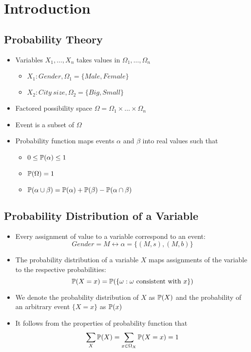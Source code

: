 \section{Introduction}

\subsection{Probability Theory}
	\begin{frame}
		\begin{itemize}
			\item Variables $X_1, \ldots , X_n$ takes values in $\Omega_1 , \ldots , \Omega_n$
				\begin{itemize}
					\item $X_1: {Gender} , \Omega_1 = \{ {Male} , {Female} \}$
					\item $X_2: {City\ size} , \Omega_2 = \{ {Big} , {Small} \}$
				\end{itemize}
			\item Factored possibility space $\Omega = \Omega_1 \times \ldots \times \Omega_n$
			\item Event is a subset of $\Omega$
			\item Probability function maps events $\alpha$ and $\beta$ into real values such that
			\begin{itemize}
				\item $0 \leq \P( \alpha ) \leq 1 $
				\item $\P( \Omega ) = 1$
				\item $\P( \alpha \cup \beta ) = \P( \alpha ) + \P( \beta ) - \P( \alpha \cap \beta )$
			\end{itemize}
		\end{itemize}
	\end{frame}

\subsection{Probability Distribution of a Variable}
	\begin{frame}
		\begin{itemize}
			\item Every assignment of value to a variable correspond to an event:
				\[ {Gender} = M \leftrightarrow \alpha = \{ ( M , s ) , ( M , b ) \} \]
			\item The probability distribution of a variable $X$ maps assignments of the variable to the respective probabilities:
				\[ \P( X = x ) = \P( \{ \omega : \omega \text{ consistent with } x \} ) \]
			\item We denote the probability distribution of $X$ as $\P( X )$ and the probability of an arbitrary event $\{ X = x \}$ as $\P( x )$
			\item It follows from the properties of probability function that
				\[ \sum_X \P( X ) = \sum_{x \in \Omega_X} \P( X = x ) = 1 \]
		\end{itemize}
	\end{frame}

